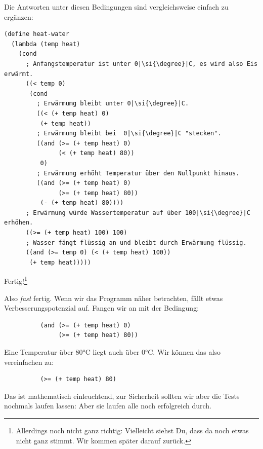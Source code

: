 %
Die Antworten unter diesen Bedingungen sind vergleichsweise einfach zu
ergänzen:
%
\begin{lstlisting}
(define heat-water
  (lambda (temp heat)
    (cond
      ; Anfangstemperatur ist unter 0|\si{\degree}|C, es wird also Eis erwärmt.
      ((< temp 0)
       (cond
         ; Erwärmumg bleibt unter 0|\si{\degree}|C.
         ((< (+ temp heat) 0)
          (+ temp heat))
         ; Erwärmung bleibt bei  0|\si{\degree}|C "stecken".
         ((and (>= (+ temp heat) 0)
               (< (+ temp heat) 80))
          0)
         ; Erwärmung erhöht Temperatur über den Nullpunkt hinaus.
         ((and (>= (+ temp heat) 0)
               (>= (+ temp heat) 80))
          (- (+ temp heat) 80))))
      ; Erwärmung würde Wassertemperatur auf über 100|\si{\degree}|C erhöhen.
      ((>= (+ temp heat) 100) 100)
      ; Wasser fängt flüssig an und bleibt durch Erwärmung flüssig.
      ((and (>= temp 0) (< (+ temp heat) 100))
       (+ temp heat)))))
\end{lstlisting}
%
Fertig!\footnote{Allerdings noch nicht ganz richtig: Vielleicht siehst Du,
  dass da noch etwas nicht ganz stimmt.  Wir kommen später darauf zurück.}

\medskip

Also \emph{fast} fertig.  Wenn wir das Programm näher betrachten,
fällt etwas Verbesserungspotenzial auf.  Fangen wir an mit der
Bedingung:
%
\begin{lstlisting}
          (and (>= (+ temp heat) 0)
               (>= (+ temp heat) 80))
\end{lstlisting}
%
Eine Temperatur über 80\si{\degree}C liegt auch über 0\si{\degree}C.
Wir können das also vereinfachen zu:
%
\begin{lstlisting}
          (>= (+ temp heat) 80)
\end{lstlisting}
%
Das ist mathematisch einleuchtend, zur Sicherheit sollten wir aber die
Tests nochmals laufen lassen: Aber sie laufen alle noch erfolgreich
durch.

